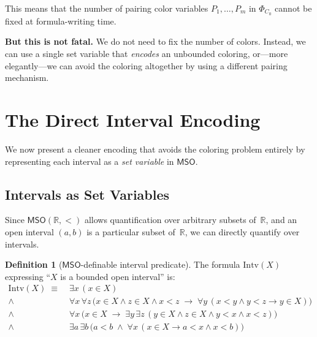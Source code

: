 \documentclass[a4paper,11pt]{article}
\theoremstyle{definition}
\newtheorem{definition}[theorem]{Definition}
\newcommand{\MSO}{\ensuremath{\mathsf{MSO}}}
\newcommand{\reals}{\ensuremath{\mathbb{R}}}
\begin{document}
This means that the number of pairing color variables $P_1, \ldots,
P_m$ in $\Phi_{C_0}$ cannot be fixed at formula-writing time.

\medskip
\noindent
\textbf{But this is not fatal.}\; We do not need to fix the number
of colors. Instead, we can use a single set variable that \emph{encodes}
an unbounded coloring, or---more elegantly---we can avoid the
coloring altogether by using a different pairing mechanism.

\section{The Direct Interval Encoding}
\label{sec:direct}

We now present a cleaner encoding that avoids the coloring problem
entirely by representing each interval as a \emph{set variable} in
$\MSO$.

\subsection{Intervals as Set Variables}

Since $\MSO(\reals, <)$ allows quantification over arbitrary subsets
of~$\reals$, and an open interval $(a, b)$ is a particular subset
of~$\reals$, we can directly quantify over intervals.

\begin{definition}[$\MSO$-definable interval predicate]
\label{def:interval-pred}
The formula $\mathrm{Intv}(X)$ expressing ``$X$ is a bounded open
interval'' is:
\begin{align*}
  \mathrm{Intv}(X) \;\equiv\;
  &\exists x\,(x \in X) \tag{nonempty} \\
  \land\; &\forall x\,\forall z\,\bigl(x \in X \land z \in X
    \land x < z \;\to\; \forall y\,(x < y \land y < z \to y \in X)\bigr)
    \tag{convex} \\
  \land\; &\forall x\,\bigl(x \in X \;\to\; \exists y\,\exists z\,
    (y \in X \land z \in X \land y < x \land x < z)\bigr)
    \tag{open} \\
  \land\; &\exists a\,\exists b\,\bigl(a < b \;\land\;
    \forall x\,(x \in X \to a < x \land x < b)\bigr)
    \tag{bounded}
\end{align*}
\end{definition}
\end{document}
